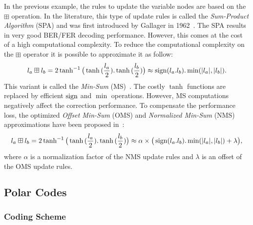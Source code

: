 In the previous example, the rules to update the variable nodes are based on the
$\boxplus$ operation. In the literature, this type of update rules is called the
\emph{Sum-Product Algorithm} (SPA) and was first introduced by Gallager in
1962~\cite{Gallager1962}. The SPA results in very good BER/FER decoding
performance. However, this comes at the cost of a high computational complexity.
To reduce the computational complexity on the $\boxplus$ operator it is possible
to approximate it as follow:
\begin{equation}
\label{eq:ctx_ldpc_ms}
l_a \boxplus l_b = 2\tanh^{-1}{\big(\tanh{(\frac{l_a}{2}).\tanh{(\frac{l_b}{2})}}\big)} \approx \operatorname*{sign}(l_a.l_b).\min(|l_a|, |l_b|).
\end{equation}
This variant is called the \emph{Min-Sum} (MS)~\cite{Fossorier1999}.
The costly $\tanh$ functions are replaced by efficient $\operatorname*{sign}$ and $\min$
operations. However, MS computations negatively affect the correction
performance. To compensate the performance loss, the optimized \emph{Offset
Min-Sum} (OMS) and \emph{Normalized Min-Sum} (NMS) approximations have been
proposed in~\cite{Chen2002}:
\begin{equation}
\label{eq:ctx_ldpc_onms}
l_a \boxplus l_b = 2\tanh^{-1}{\big(\tanh{(\frac{l_a}{2}).\tanh{(\frac{l_b}{2})}}\big)} \approx \alpha \times \big( \operatorname*{sign}(l_a.l_b).\min(|l_a|, |l_b|) + \lambda \big),
\end{equation}
where $\alpha$ is a normalization factor of the NMS update rules and $\lambda$
is an offset of the OMS update rules.

\subsection{Polar Codes}
\label{sec:ctx_polar}

\subsubsection{Coding Scheme}

